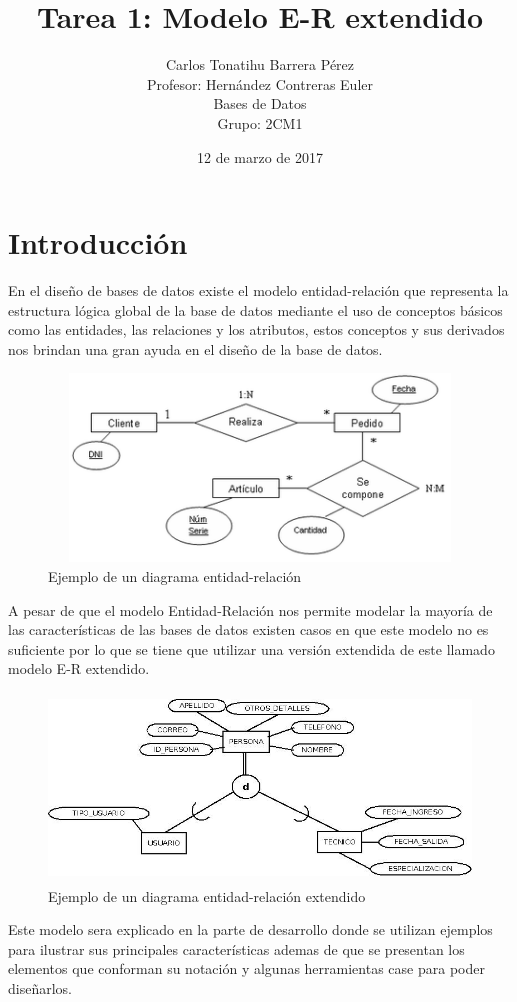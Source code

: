 \documentclass[12pt, titlepage]{article}
\title{Tarea 1: Modelo E-R extendido}
\author{Carlos Tonatihu Barrera Pérez \\ Profesor: Hernández Contreras Euler \\ Bases de Datos \\ Grupo: 2CM1 }
\date{12 de marzo de 2017}
\begin{document}
    \maketitle
    \tableofcontents
    \newpage
    \section{Introducción}
    En el diseño de bases de datos existe el modelo entidad-relación que representa la estructura lógica global de la base de datos mediante el uso de conceptos básicos como las entidades, las relaciones y los atributos, estos conceptos y sus derivados nos brindan una gran ayuda en el diseño de la base de datos.\cite{LIBRO}
    \begin{figure}[H]
        \begin{center}
            \includegraphics[width=12cm, height=5cm]{img/er.png}
            \caption{Ejemplo de un diagrama entidad-relación}
            \label{fig:modeloER}
        \end{center}
    \end{figure}
    A pesar de que el modelo Entidad-Relación nos permite modelar la mayoría de las características de las bases de datos existen casos en que este modelo no es suficiente por lo que se tiene que utilizar una versión extendida de este llamado modelo E-R extendido.
     \begin{figure}[H]
        \begin{center}
            \includegraphics[width=13cm, height=5cm]{img/ere.jpg}
            \caption{Ejemplo de un diagrama entidad-relación extendido}
            \label{fig:modeloERE}
        \end{center}
    \end{figure}
    Este modelo sera explicado en la parte de desarrollo donde se utilizan ejemplos para ilustrar sus principales características ademas de que se presentan los elementos que conforman su notación y algunas herramientas case para poder diseñarlos.
\end{document}
